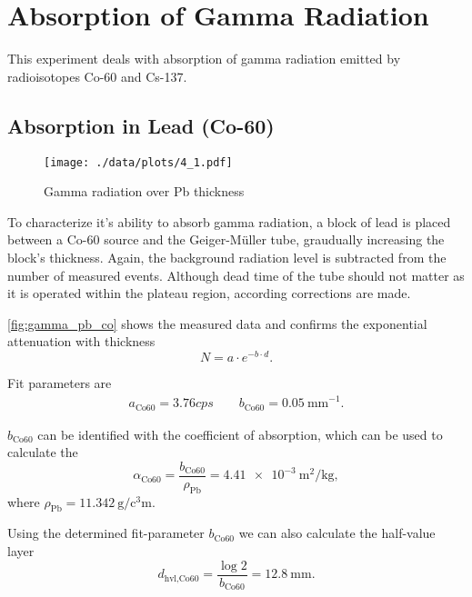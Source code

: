 \chapter{Absorption of Gamma Radiation}
This experiment deals with absorption of gamma radiation emitted by radioisotopes Co-60 and Cs-137.

\section{Absorption in Lead (Co-60)}\label{sec:co}
\begin{figure}[ht!]
	\centering
	\texttt{[image: ./data/plots/4\_1.pdf]}
	\caption[Gamma radiation over Pb thickness]{Gamma radiation over Pb thickness}
	\label{fig:gamma_pb_co}
\end{figure}
To characterize it's ability to absorb gamma radiation, a block of lead is placed between a Co-60 source and the Geiger-Müller tube, graudually increasing the block's thickness.
Again, the background radiation level is subtracted from the number of measured events.
Although dead time of the tube should not matter as it is operated within the plateau region, according corrections are made.

\autoref{fig:gamma_pb_co} shows the measured data and confirms the exponential attenuation with thickness
\begin{equation*}
	N = a \cdot e^{-b \cdot d}.
\end{equation*}

Fit parameters are
\begin{gather*}
	a_\text{Co60}=\num{3.76}cps\qquad b_\text{Co60}=\SI{0.05}{\milli\meter}^{-1}.
\end{gather*}

$b_\text{Co60}$ can be identified with the coefficient of absorption, which can be used to calculate the 
\begin{equation*}
	\alpha_\text{Co60}=\frac{b_\text{Co60}}{\rho_\text{Pb}}=\SI{4.41e-3}{\meter\squared\per\kilogram},
\end{equation*}
where $\rho_\text{Pb}=\SI{11.342}{\gram\per\cubic\centi\meter}$.

Using the determined fit-parameter $b_\text{Co60}$ we can also calculate the half-value layer
\begin{equation*}
	d_\text{hvl,Co60}=\frac{\log{2}}{b_\text{Co60}}=\SI{12.8}{\milli\meter}.
\end{equation*}

